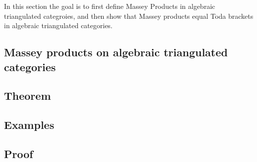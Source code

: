 In this section the goal is to first define Massey Products in algebraic triangulated categroies, and then show that Massey products equal Toda brackets in algebraic triangulated categories.

\subsection{Massey products on algebraic triangulated categories}


\subsection{Theorem}


\subsection{Examples}


\subsection{Proof}
